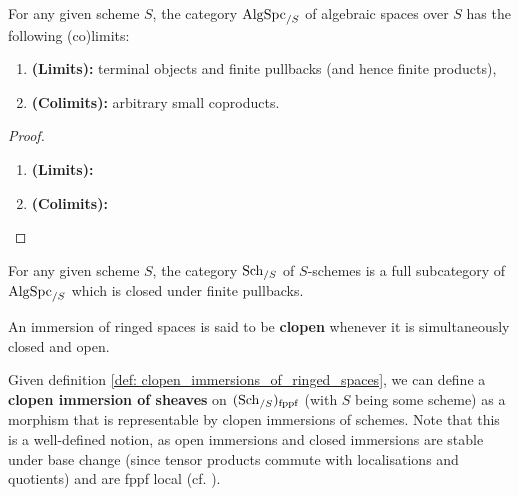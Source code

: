             \begin{proposition} \label{prop: (co)limits_of_algebraic_spaces}
                For any given scheme $S$, the category $\mathrm{Alg}\mathrm{Spc}_{/S}$ of algebraic spaces over $S$ has the following (co)limits:
                    \begin{enumerate}
                        \item \textbf{(Limits):} terminal objects and finite pullbacks (and hence finite products),
                        \item \textbf{(Colimits):} arbitrary small coproducts.
                    \end{enumerate}
            \end{proposition}
                \begin{proof}
                    \noindent
                    \begin{enumerate}
                        \item \textbf{(Limits):} 
                        \item \textbf{(Colimits):} 
                    \end{enumerate}
                \end{proof}
            \begin{corollary} \label{coro: schemes_are_algebraic_spaces}
                For any given scheme $S$, the category $\mathrm{Sch}_{/S}$ of $S$-schemes is a full subcategory of $\mathrm{Alg}\mathrm{Spc}_{/S}$ which is closed under finite pullbacks.
            \end{corollary}
            \begin{definition} \label{def: clopen_immersions_of_ringed_spaces}
                An immersion of ringed spaces is said to be \textbf{clopen} whenever it is simultaneously closed and open.
            \end{definition}
            \begin{remark} \label{remark: clopen_immersions_of_fppf_sheaves}
                Given definition \ref{def: clopen_immersions_of_ringed_spaces}, we can define a \textbf{clopen immersion of sheaves} on $(\mathrm{Sch}_{/S})_{\mathrm{fppf}}$ (with $S$ being some scheme) as a morphism that is representable by clopen immersions of schemes. Note that this is a well-defined notion, as open immersions and closed immersions are stable under base change (since tensor products commute with localisations and quotients) and are fppf local (cf. \cite[\href{https://stacks.math.columbia.edu/tag/01JY}{Tag 01JY}]{stacks}).
            \end{remark}
